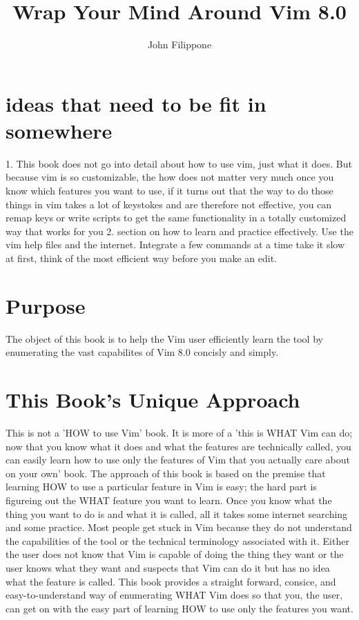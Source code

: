 \documentclass[12pt]{book}
\title{Wrap Your Mind Around Vim 8.0}
\author{John Filippone}
\begin{document}
\maketitle

\section{ideas that need to be fit in somewhere}
1. This book does not go into detail about how to use vim, just what it does.
But because vim is so customizable, the how does not matter very much
once you know which features you want to use, if it turns out that the way to do those things in vim takes a lot of keystokes and are therefore
not effective, you can remap keys or write scripts to get the same functionality in a totally customized way that works for you
2. section on how to learn and practice effectively.
Use the vim help files and the internet.
Integrate a few commands at a time take it slow at first, think of the most efficient way before you make an edit.

\section{Purpose}
The object of this book is to help the Vim user efficiently learn the tool by enumerating the vast capabilites of Vim 8.0 concisly and simply.

\section{This Book's Unique Approach}
This is not a 'HOW to use Vim' book.
It is more of a 'this is WHAT Vim can do; now that you know what it does and what the features are technically called, you can easily learn how to use only the features of Vim
that you actually care about on your own' book.
The approach of this book is based on the premise that learning HOW to use a particular feature in Vim is easy; the hard part is figureing out the WHAT feature you want to learn.
Once you know what the thing you want to do is and what it is called, all it takes some internet searching and some practice.
Most people get stuck in Vim because they do not understand the capabilities of the tool or the technical terminology associated with it.
Either the user does not know that Vim is capable of doing the thing they want or the user knows what they want and suspects that Vim can do it but has no idea what the feature is called.
This book provides a straight forward, consice, and easy-to-understand way of enumerating WHAT Vim does so that you, the user, can get on with the easy part of learning HOW to use only the
features you want.
\end{document}

